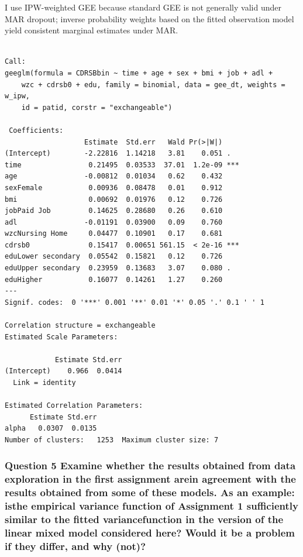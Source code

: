 \documentclass[
  11pt,
  letterpaper,
  DIV=11,
  numbers=noendperiod]{scrartcl}
\begin{document}
I use IPW-weighted GEE because standard GEE is not generally valid under
MAR dropout; inverse probability weights based on the fitted observation
model yield consistent marginal estimates under MAR.

\begin{verbatim}

Call:
geeglm(formula = CDRSBbin ~ time + age + sex + bmi + job + adl + 
    wzc + cdrsb0 + edu, family = binomial, data = gee_dt, weights = w_ipw, 
    id = patid, corstr = "exchangeable")

 Coefficients:
                   Estimate  Std.err   Wald Pr(>|W|)    
(Intercept)        -2.22816  1.14218   3.81    0.051 .  
time                0.21495  0.03533  37.01  1.2e-09 ***
age                -0.00812  0.01034   0.62    0.432    
sexFemale           0.00936  0.08478   0.01    0.912    
bmi                 0.00692  0.01976   0.12    0.726    
jobPaid Job         0.14625  0.28680   0.26    0.610    
adl                -0.01191  0.03900   0.09    0.760    
wzcNursing Home     0.04477  0.10901   0.17    0.681    
cdrsb0              0.15417  0.00651 561.15  < 2e-16 ***
eduLower secondary  0.05542  0.15821   0.12    0.726    
eduUpper secondary  0.23959  0.13683   3.07    0.080 .  
eduHigher           0.16077  0.14261   1.27    0.260    
---
Signif. codes:  0 '***' 0.001 '**' 0.01 '*' 0.05 '.' 0.1 ' ' 1

Correlation structure = exchangeable 
Estimated Scale Parameters:

            Estimate Std.err
(Intercept)    0.966  0.0414
  Link = identity 

Estimated Correlation Parameters:
      Estimate Std.err
alpha   0.0307  0.0135
Number of clusters:   1253  Maximum cluster size: 7 
\end{verbatim}

\subsubsection{Question 5 Examine whether the results obtained from data
exploration in the first assignment arein agreement with the results
obtained from some of these models. As an example: isthe empirical
variance function of Assignment 1 sufficiently similar to the fitted
variancefunction in the version of the linear mixed model considered
here? Would it be a problem if they differ, and why
(not)?}\label{question-5-examine-whether-the-results-obtained-from-data-exploration-in-the-first-assignment-arein-agreement-with-the-results-obtained-from-some-of-these-models.-as-an-example-isthe-empirical-variance-function-of-assignment-1-sufficiently-similar-to-the-fitted-variancefunction-in-the-version-of-the-linear-mixed-model-considered-here-would-it-be-a-problem-if-they-differ-and-why-not}
\end{document}
